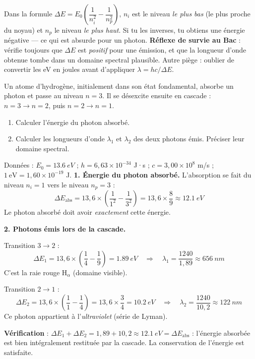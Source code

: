 \documentclass[11pt]{article}
\begin{document}
\begin{attention}
Dans la formule $\Delta E = E_0\left(\dfrac{1}{n_i^2} - \dfrac{1}{n_p^2}\right)$, $n_i$ est le niveau \emph{le plus bas} (le plus proche du noyau) et $n_p$ le niveau \emph{le plus haut}. Si tu les inverses, tu obtiens une énergie négative — ce qui est absurde pour un photon. \textbf{Réflexe de survie au Bac} : vérifie toujours que $\Delta E$ est \emph{positif} pour une émission, et que la longueur d'onde obtenue tombe dans un domaine spectral plausible. Autre piège : oublier de convertir les eV en joules avant d'appliquer $\lambda = hc/\Delta E$.
\end{attention}

\begin{exoresolu}
Un atome d'hydrogène, initialement dans son état fondamental, absorbe un photon et passe au niveau $n = 3$. Il se désexcite ensuite en cascade : $n = 3 \rightarrow n = 2$, puis $n = 2 \rightarrow n = 1$.
\begin{enumerate}
\item Calculer l'énergie du photon absorbé.
\item Calculer les longueurs d'onde $\lambda_1$ et $\lambda_2$ des deux photons émis. Préciser leur domaine spectral.
\end{enumerate}
Données : $E_0 = \SI{13,6}{eV}$ ; $h = 6{,}63\times 10^{-34}$ J·s ; $c = 3{,}00\times 10^{8}$ m/s ; $1\ \text{eV} = 1{,}60\times 10^{-19}$ J.
\tcblower
\textbf{1. Énergie du photon absorbé.} L'absorption se fait du niveau $n_i = 1$ vers le niveau $n_p = 3$ :
\[ \Delta E_{\text{abs}} = 13{,}6 \times \left(\frac{1}{1^2} - \frac{1}{3^2}\right) = 13{,}6 \times \frac{8}{9} \approx \SI{12,1}{eV} \]
Le photon absorbé doit avoir \emph{exactement} cette énergie.

\textbf{2. Photons émis lors de la cascade.}

Transition $3 \rightarrow 2$ :
\[ \Delta E_1 = 13{,}6 \times \left(\frac{1}{4} - \frac{1}{9}\right) = \SI{1,89}{eV} \quad \Rightarrow \quad \lambda_1 = \frac{1240}{1{,}89} \approx \SI{656}{nm} \]
C'est la raie rouge H$_\alpha$ (domaine visible).

Transition $2 \rightarrow 1$ :
\[ \Delta E_2 = 13{,}6 \times \left(\frac{1}{1} - \frac{1}{4}\right) = 13{,}6 \times \frac{3}{4} = \SI{10,2}{eV} \quad \Rightarrow \quad \lambda_2 = \frac{1240}{10{,}2} \approx \SI{122}{nm} \]
Ce photon appartient à l'\emph{ultraviolet} (série de Lyman).

\textbf{Vérification} : $\Delta E_1 + \Delta E_2 = 1{,}89 + 10{,}2 \approx \SI{12,1}{eV} = \Delta E_{\text{abs}}$ : l'énergie absorbée est bien intégralement restituée par la cascade. La conservation de l'énergie est satisfaite.
\end{exoresolu}
\end{document}
